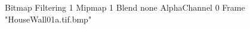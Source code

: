 {Bitmap
	{Filtering 1}
	{Mipmap 1}
	{Blend none}
	{AlphaChannel 0}
	{Frame "HouseWall01a.tif.bmp"}
}
